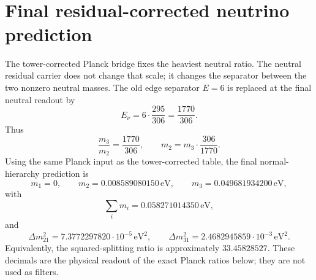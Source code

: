 \documentclass[11pt]{article}
\begin{document}
\begin{code}
\AgdaSpace{}%
\AgdaSymbol{=}\AgdaSpace{}%
\<%
\\
%
\>[2]\AgdaSymbol{;}\AgdaSpace{}%
\AgdaSpace{}%
\AgdaSymbol{=}\AgdaSpace{}%
\<%
\\
%
\>[2]\AgdaSymbol{;}\AgdaSpace{}%
%
\>[34]\AgdaSymbol{=}\AgdaSpace{}%
\<%
\\
%
\>[2]\AgdaSymbol{;}\AgdaSpace{}%
%
\>[34]\AgdaSymbol{=}\AgdaSpace{}%
\<%
\\
%
\>[2]\AgdaSymbol{;}\AgdaSpace{}%
%
\>[34]\AgdaSymbol{=}\AgdaSpace{}%
\<%
\\
%
\>[2]\AgdaSymbol{;}\AgdaSpace{}%
%
\>[34]\AgdaSymbol{=}\AgdaSpace{}%
\<%
\\
%
\>[2]\AgdaSymbol{\}}\<%
\end{code}

\section{Final residual-corrected neutrino prediction}

The tower-corrected Planck bridge fixes the heaviest neutral ratio.  The
neutral residual carrier does not change that scale; it changes the
separator between the two nonzero neutral masses.  The old edge separator
$E=6$ is replaced at the final neutral readout by
\[
  E_\nu = 6\cdot\frac{295}{306} = \frac{1770}{306}.
\]
Thus
\[
  \frac{m_3}{m_2}=\frac{1770}{306},\qquad
  m_2 = m_3\cdot\frac{306}{1770}.
\]
Using the same Planck input as the tower-corrected table, the final
normal-hierarchy prediction is
\[
  m_1 = 0,
  \qquad m_2 = 0.008589080150\,\mathrm{eV},
  \qquad m_3 = 0.049681934200\,\mathrm{eV},
\]
with
\[
  \sum_i m_i = 0.058271014350\,\mathrm{eV},
\]
and
\[
  \Delta m^2_{21} = 7.3772297820\cdot10^{-5}\,\mathrm{eV}^2,
  \qquad
  \Delta m^2_{31} = 2.4682945859\cdot10^{-3}\,\mathrm{eV}^2.
\]
Equivalently, the squared-splitting ratio is approximately
$33.45828527$.  These decimals are the physical readout of the exact
Planck ratios below; they are not used as filters.
\end{document}
